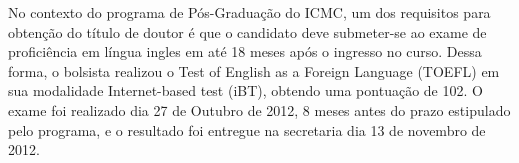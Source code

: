 
No contexto do programa de Pós-Graduação do ICMC, um dos requisitos para obtenção do título de doutor é que o candidato deve submeter-se ao exame de proficiência em língua ingles em até 18 meses após o ingresso no curso. Dessa forma, o bolsista realizou o Test of English as a Foreign Language (TOEFL) em sua modalidade Internet-based test (iBT), obtendo uma pontuação de 102. O exame foi realizado dia 27 de Outubro de 2012, 8 meses antes do prazo estipulado pelo programa, e o resultado foi entregue na secretaria dia 13 de novembro de 2012.
